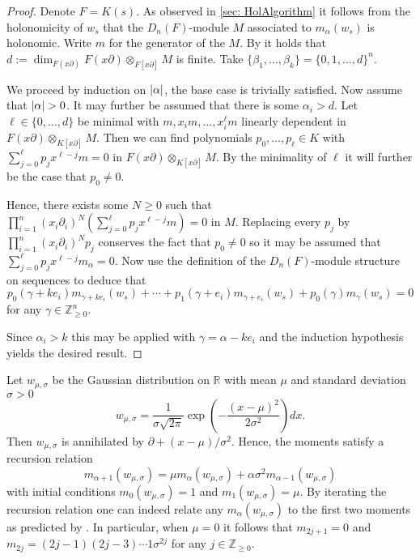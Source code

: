 \begin{proof}
  Denote $F = K(s).$
  As observed in \cref{sec: HolAlgorithm} it follows from the holonomicity of $w_s$ that the $D_n(F)$-module $M$ associated to $m_{\alpha}(w_s)$ is holonomic.
  Write $m$ for the generator of the $M$.
  By  it holds that $d:=\dim_{F(x\partial)}F(x\partial)\otimes_{F[x\partial]}M$ is finite.
  Take $\{\beta_1,\ldots,\beta_k\} = \{0,1,\ldots,d\}^n$.

  We proceed by induction on $\vert \alpha \vert$, the base case is trivially satisfied.
  Now assume that $\vert \alpha \vert>0$.
  It may further be assumed that there is some $\alpha_i>d$.
  Let $\ell \in \{0,\ldots,d\}$ be minimal with $m, x_im,\ldots,x_i^{\ell}m$ linearly dependent in $F(x\partial)\otimes_{K[x\partial]}M$.
  Then we can find polynomials $p_0,\ldots, p_\ell\in K$ with $\sum_{j=0}^\ell p_j x^{\ell - j} m =0$ in $F(x\partial)\otimes_{K[x\partial]}M$.
  By the minimality of $\ell$ it will further be the case that $p_0\neq 0$.

  Hence, there exists some $N\geq 0$ such that $\prod_{i=1}^n (x_i\partial_i)^N(\sum_{j=0}^\ell p_j x^{\ell - j} m) = 0$ in $M$.
  Replacing every $p_j$ by $\prod_{i=1}^n(x_i\partial_i)^Np_j$ conserves the fact that $p_0\neq 0$ so it may be assumed that $\sum_{j=0}^\ell p_j x^{\ell - j} m_{\alpha} =0$.
  Now use the definition of the $D_n(F)$-module structure on sequences to deduce that
  $$ p_0(\gamma + ke_i)  m_{\gamma +ke_i}(w_s) + \cdots + p_1(\gamma +e_i)m_{\gamma + e_i}(w_s) + p_0(\gamma)m_{\gamma}(w_s) =0$$
  for any $\gamma \in \mathbb{Z}_{\geq 0}^n$.

  Since $\alpha_i >k$ this may be applied with $\gamma = \alpha - ke_i$ and the induction hypothesis yields the desired result.
\end{proof}
\begin{example}\label{ex: GaussianMono}
  Let $w_{\mu,\sigma}$ be the Gaussian distribution on $\mathbb{R}$ with mean $\mu$ and standard deviation $\sigma>0$
  $$w_{\mu,\sigma} =\frac{1}{\sigma \sqrt{2\pi}} \exp\left(-\frac{(x-\mu)^2}{2\sigma^2}\right)dx.$$
  Then $w_{\mu,\sigma}$ is annihilated by $\partial +(x-\mu)/\sigma^2$.
  Hence, the moments satisfy a recursion relation
  $$m_{\alpha + 1}(w_{\mu,\sigma}) = \mu m_{\alpha}(w_{\mu,\sigma}) + \alpha \sigma^2 m_{\alpha-1}(w_{\mu,\sigma})$$
  with initial conditions $m_{0}(w_{\mu,\sigma}) =1$ and $ m_1(w_{\mu,\sigma}) = \mu.$
  By iterating the recursion relation one can indeed relate any $m_\alpha(w_{\mu,\sigma})$ to the first two moments as predicted by .
  In particular, when $\mu = 0$ it follows that $m_{2j + 1}= 0$ and $m_{2j} = (2j - 1)(2j - 3)\cdots 1 \sigma^{2j}$ for any $j\in \mathbb{Z}_{\geq 0}$.
\end{example}
